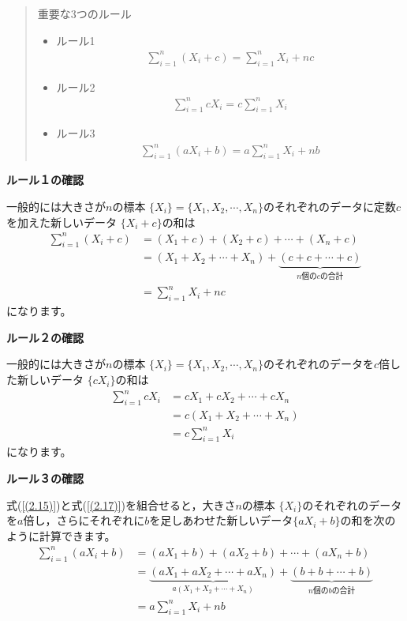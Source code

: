 \documentclass[
]{book}
\theoremstyle{definition}
\theoremstyle{definition}
\theoremstyle{definition}
\theoremstyle{definition}
\theoremstyle{remark}
\begin{document}
\begin{quote}
重要な3つのルール

\begin{itemize}
\item
  ルール1
  \begin{align*}
  \sum_{i=1}^n (X_i+c)=\sum_{i=1}^n X_i+nc
  \end{align*}
\item
  ルール2
  \begin{align*}
  \sum_{i=1}^n c X_i=c \sum_{i=1}^n X_i
  \end{align*}
\item
  ルール3
  \begin{align*}
  \sum_{i=1}^n (a X_i+b)=a \sum_{i=1}^n X_i +nb
  \end{align*}
\end{itemize}
\end{quote}

\textbf{ルール１の確認}

一般的には大きさが\(n\)の標本 \(\{ X_i \}=\{ X_1,X_2,\cdots,X_n \}\)のそれぞれのデータに定数\(c\)を加えた新しいデータ \(\{ X_i+c \}\)の和は
\begin{align}
\sum_{i=1}^n (X_i+c)
&=(X_1+c)+(X_2+c)+\cdots+(X_n+c) \nonumber \\
&=(X_1+X_2+\cdots+X_n)+\underbrace{(c+c+\cdots+c)}_{\text{$n$個の$c$の合計}} \nonumber \\
&=\sum_{i=1}^n X_i+nc \label{(2.15)}
\end{align}
になります。

\textbf{ルール２の確認}

一般的には大きさが\(n\)の標本 \(\{ X_i \}=\{ X_1,X_2,\cdots,X_n \}\)のそれぞれのデータを\(c\)倍した新しいデータ \(\{ c X_i \}\)の和は
\begin{align}
\sum_{i=1}^n c X_i
&=c X_1+c X_2+\cdots+c X_n \nonumber \\
&=c (X_1+X_2+\cdots+X_n) \nonumber \\
&=c \sum_{i=1}^n X_i \label{(2.17)}
\end{align}
になります。

\textbf{ルール３の確認}

式(\ref{(2.15)})と式(\ref{(2.17)})を組合せると，大きさ\(n\)の標本 \(\{ X_i \}\)のそれぞれのデータを\(a\)倍し，さらにそれぞれに\(b\)を足しあわせた新しいデータ\(\{ aX_i+b \}\)の和を次のように計算できます。
\begin{align}
\sum_{i=1}^n (a X_i+b)
&=(a X_1+b)+(a X_2+b)+\cdots+(a X_n+b) \nonumber \\
&=\underbrace{(aX_1+aX_2+\cdots+aX_n)}_{a (X_1+X_2+\cdots+X_n)}+\underbrace{(b+b+\cdots+b)}_{\text{$n$個の$b$の合計}} \nonumber \\
&=a \sum_{i=1}^n X_i+nb \label{(2.18)}
\end{align}
\end{document}
